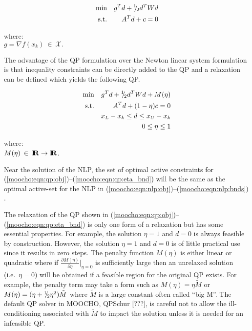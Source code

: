 \documentclass[pdf,ps2pdf,11pt]{SANDreport}
\begin{document}
{{{\bsinglespace
\begin{eqnarray}
\mbox{min}  &  & g^T d + {}^1 \!\! / \! {}_2 d^T W d   \label{moocho:eqn:qp_newton:obj} \\
\mbox{s.t.} &  & A^T d + c = 0                \label{moocho:eqn:qp_newton:equ}
\end{eqnarray}
\begin{tabbing}
\hspace{4ex}where:\hspace{5ex}\= \\
\>	$g = \nabla f(x_k) \:\in\:\mathcal{X}.$
\end{tabbing}
\esinglespace}

The advantage of the QP formulation over the Newton linear system formulation
is that inequality constraints can be directly added to the QP and a
relaxation can be defined which yields the following QP.

{\bsinglespace
\begin{eqnarray}
\mbox{min}  &  & g^T d + {}^1 \!\! / \! {}_2 d^T W d + M(\eta)                   \label{moocho:eqn:qp:obj} \\
\mbox{s.t.} &  & A^T d + (1-\eta) c = 0                                 \label{moocho:eqn:qp:equ} \\
            &  & x_L - x_k \leq d \leq x_U -x_k                         \label{moocho:eqn:qp:bnds} \\
            &  & 0 \leq \eta \leq 1                                     \label{moocho:eqn:qp:eta_bnd}
\end{eqnarray}
\begin{tabbing}
\hspace{4ex}where:\hspace{5ex}\= \\
\>	$M(\eta) \:\in\:\mbox{\textbf{I}}\hspace{-0.6ex}\mbox{\textbf{R}} \rightarrow \mbox{\textbf{I}}\hspace{-0.6ex}\mbox{\textbf{R}}$.
\end{tabbing}
\esinglespace}

Near the solution of the NLP, the set of optimal active constraints for
(\ref{moocho:eqn:qp:obj})--(\ref{moocho:eqn:qp:eta_bnd}) will be the same as
the optimal active-set for the NLP in
(\ref{moocho:eqn:nlp:obj})--(\ref{moocho:eqn:nlp:bnds}) {}\cite[Theorem
18.1]{ref:nocedal_wright_1999}.

The relaxation of the QP shown in
(\ref{moocho:eqn:qp:obj})--(\ref{moocho:eqn:qp:eta_bnd}) is only one form of a
relaxation but has some essential properties.  For example, the solution $\eta
= 1$ and $d = 0$ is always feasible by construction.  However, the solution
$\eta = 1$ and $d = 0$ is of little practical use since it results in zero
steps.  The penalty function $M(\eta)$ is either linear or quadratic where if
$\frac{\partial M(\eta)}{\partial {}\eta}|_{\eta = 0}$ is sufficiently large
then an unrelaxed solution (i.e.\ $\eta = 0$) will be obtained if a feasible
region for the original QP exists.  For example, the penalty term may take a
form such as $M(\eta) = {}\eta \tilde{M}$ or $M(\eta) = (\eta + {}{}^1 \!\! / \! {}_2
{}\eta^2)\tilde{M}$ where $\tilde{M}$ is a large constant often called ``big
M''.  The default QP solver in MOOCHO, QPSchur [???], is careful not to allow
the ill-conditioning associated with $\tilde{M}$ to impact the solution unless
it is needed for an infeasible QP.

}}
\end{document}
